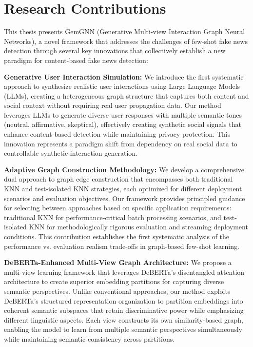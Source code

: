 \section{Research Contributions}

This thesis presents GemGNN (Generative Multi-view Interaction Graph Neural Networks), a novel framework that addresses the challenges of few-shot fake news detection through several key innovations that collectively establish a new paradigm for content-based fake news detection:


\textbf{Generative User Interaction Simulation:} We introduce the first systematic approach to synthesize realistic user interactions using Large Language Models (LLMs), creating a heterogeneous graph structure that captures both content and social context without requiring real user propagation data. Our method leverages LLMs to generate diverse user responses with multiple semantic tones (neutral, affirmative, skeptical), effectively creating synthetic social signals that enhance content-based detection while maintaining privacy protection. This innovation represents a paradigm shift from dependency on real social data to controllable synthetic interaction generation.


\textbf{Adaptive Graph Construction Methodology:} We develop a comprehensive dual approach to graph edge construction that encompasses both traditional KNN and test-isolated KNN strategies, each optimized for different deployment scenarios and evaluation objectives. Our framework provides principled guidance for selecting between approaches based on specific application requirements: traditional KNN for performance-critical batch processing scenarios, and test-isolated KNN for methodologically rigorous evaluation and streaming deployment conditions. This contribution establishes the first systematic analysis of the performance vs. evaluation realism trade-offs in graph-based few-shot learning.

\textbf{DeBERTa-Enhanced Multi-View Graph Architecture:} We propose a multi-view learning framework that leverages DeBERTa's disentangled attention architecture to create superior embedding partitions for capturing diverse semantic perspectives. Unlike conventional approaches, our method exploits DeBERTa's structured representation organization to partition embeddings into coherent semantic subspaces that retain discriminative power while emphasizing different linguistic aspects. Each view constructs its own similarity-based graph, enabling the model to learn from multiple semantic perspectives simultaneously while maintaining semantic consistency across partitions.

